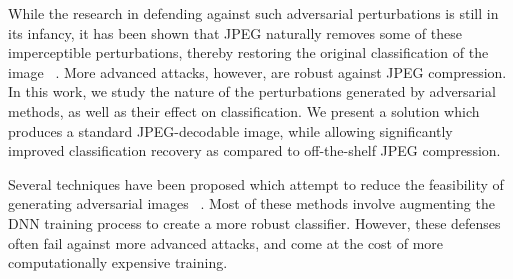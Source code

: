 While the research in defending against such adversarial perturbations is still in its infancy, it has been shown that JPEG naturally removes some of these imperceptible  perturbations, thereby restoring the original classification of the image ~\cite{Das2017KeepingTB,Dziugaite2016ASO}.
More advanced attacks, however, are robust against JPEG compression.
In this work, we study the nature of the perturbations generated by adversarial methods, as well as their effect on classification. We present a solution which produces a standard JPEG-decodable image, while allowing significantly improved classification recovery as compared to off-the-shelf JPEG compression.




Several techniques have been proposed which attempt to reduce the feasibility of generating adversarial images ~\cite{Papernot2016DistillationAA,Miyato2015DistributionalSW}. Most of these methods involve augmenting the DNN training process to create a more robust classifier.
However, these defenses often fail against more advanced attacks, and come at the cost of more computationally expensive training. 

